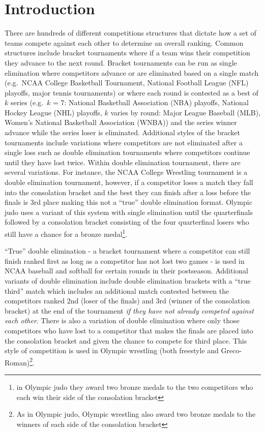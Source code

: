 \documentclass[
  12pt]{article}
\begin{document}
\newpage
{} %


\section{Introduction}\label{introduction}

There are hundreds of different competitions structures that dictate how
a set of teams compete against each other to determine an overall
ranking. Common structures include bracket tournaments where if a team
wins their competition they advance to the next round. Bracket
tournaments can be run as single elimination where competitors advance
or are eliminated based on a single match (e.g.~NCAA College Basketball
Tournament, National Football League (NFL) playoffs, major tennis
tournaments) or where each round is contested as a best of \(k\) series
(e.g.~\(k\) = 7: National Basketball Association (NBA) playoffs,
National Hockey League (NHL) playoffs, \(k\) varies by round: Major
League Baseball (MLB), Women's National Basketball Association (WNBA))
and the series winner advance while the series loser is eliminated.
Additional styles of the bracket tournaments include variations where
competitors are not eliminated after a single loss such as double
elimination tournaments where competitors continue until they have lost
twice. Within double elimination tournament, there are several
variations. For instance, the NCAA College Wrestling tournament is a
double elimination tournament, however, if a competitor loses a match
they fall into the consolation bracket and the best they can finish
after a loss before the finals is 3rd place making this not a ``true''
double elimination format. Olympic judo uses a variant of this system
with single elimination until the quarterfinals followed by a
consolation bracket consisting of the four quarterfinal losers who still
have a chance for a bronze medal\footnote{in Olympic judo they award two
  bronze medals to the two competitors who each win their side of the
  consolation bracket}.

``True'' double elimination - a bracket tournament where a competitor
can still finish ranked first as long as a competitor has not lost two
games - is used in NCAA baseball and softball for certain rounds in
their postseason. Additional variants of double elimination include
double elimination brackets with a ``true third'' match which includes
an additional match contested between the competitors ranked 2nd (loser
of the finals) and 3rd (winner of the consolation bracket) at the end of
the tournament \emph{if they have not already competed against each
other}. There is also a variation of double elimination where only those
competitors who have lost to a competitor that makes the finals are
placed into the consolation bracket and given the chance to compete for
third place. This style of competition is used in Olympic wrestling
(both freestyle and Greco-Roman)\footnote{As in Olympic judo, Olympic
  wrestling also award two bronze medals to the winners of each side of
  the consolation bracket}.
\end{document}
